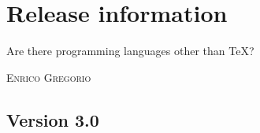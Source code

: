 \documentclass[a4paper,twoside,12pt]{memoir}
\begin{document}
%
%
%
%
%
%
%
\chapter*{Release information}
\label{chap:releaseinformation}

\epigraph{Are there programming languages other than \TeX?}{\textsc{Enrico Gregorio}}

\section*{Version 3.0}
\end{document}
